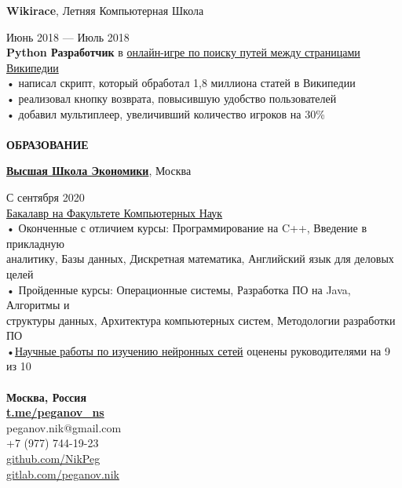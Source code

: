 \documentclass{article}
\begin{document}
\begin{vwcol}[widths={0.8,0.2},
 sep=.8cm, justify=flush,rule=0pt,indent=1em]
\begin{Large}
\textbf{Wikirace}, Летняя Компьютерная Школа
\end{Large}
\hspace{45pt}Июнь 2018 — Июль 2018\\
\textbf{Python Разработчик} в \href{https://github.com/igoose1/wikirace}{онлайн-игре по поиску путей между страницами Википедии}\\
• написал скрипт, который обработал 1,8 миллиона статей в Википедии\\
• реализовал кнопку возврата, повысившую удобство пользователей\\
• добавил мультиплеер, увеличивший количество игроков на 30\%\\
\\
\noindent\textcolor[rgb]{0.1255,0.2902,0.7843}{\textbf{\Large{ОБРАЗОВАНИЕ}}}\\
\begin{Large}
\textbf{\href{https://hse.ru/}{Высшая Школа Экономики}}, Москва
\end{Large}
\hspace{90pt}С сентября 2020\\
\href{https://cs.hse.ru/}{Бакалавр на Факультете Компьютерных Наук}\\
• Оконченные с отличием курсы: Программирование на C++, Введение в прикладную\\ аналитику, Базы данных, Дискретная математика, Английский язык для деловых целей\\
• Пройденные курсы: Операционные системы, Разработка ПО на Java, Алгоритмы и\\ структуры данных, Архитектура компьютерных систем, Методологии разработки ПО\\
•\href{https://github.com/NikPeg/synchronization-of-neuromorphic-networks-of-the-close-world-from-the-point-of-view-of-complexes} {Научные работы по изучению нейронных сетей} оценены руководителями на 9 из 10\\
\newpage
~\\
\noindent\textbf{Москва, Россия}\\
\noindent\textbf{\textcolor[rgb]{0.1255,0.2902,0.7843}{\href{https://t.me/peganov\_ns}{t.me/peganov\_ns}}}\\
peganov.nik@gmail.com\\
+7 (977) 744-19-23\\
\href{https://github.com/NikPeg}{github.com/NikPeg}\\
\href{https://gitlab.com/peganov.nik}{gitlab.com/peganov.nik}\\
\\

\end{vwcol}
\end{document}
